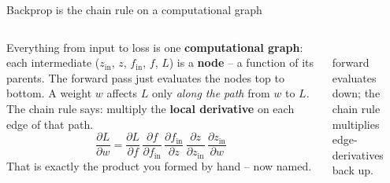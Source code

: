 \documentclass[aspectratio=169]{beamer}
\begin{document}
\begin{frame}{Backprop is the chain rule on a computational graph}
  \begin{columns}[T]
    Everything from input to loss is one \textbf{computational graph}: each intermediate
    ($z_{\text{in}}$, $z$, $f_{\text{in}}$, $f$, $L$) is a \textbf{node} -- a function of its
    parents. The forward pass just evaluates the nodes top to bottom.
    \vskip 6pt
    A weight $w$ affects $L$ only \emph{along the path} from $w$ to $L$. The chain rule says:
    multiply the \textbf{local derivative} on each edge of that path.
    \[
      \frac{\partial L}{\partial w}
      = \frac{\partial L}{\partial f}\,
        \frac{\partial f}{\partial f_{\text{in}}}\,
        \frac{\partial f_{\text{in}}}{\partial z}\,
        \frac{\partial z}{\partial z_{\text{in}}}\,
        \frac{\partial z_{\text{in}}}{\partial w}
    \]
    \footnotesize That is exactly the product you formed by hand -- now named.
    \begin{center}
      \\[2pt]
      \scriptsize forward evaluates down; the chain rule multiplies edge-derivatives back up.
    \end{center}
  \end{columns}
\end{frame}
\end{document}
